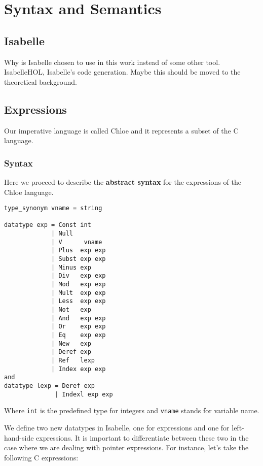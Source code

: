 \chapter{Syntax and Semantics}\label{chapter:semantics}

\section{Isabelle}

Why is Isabelle chosen to use in this work instead of some other tool.
IsabelleHOL, Isabelle's code generation.
Maybe this should be moved to the theoretical background.

\section{Expressions}

Our imperative language is called Chloe and it represents a subset of the C language.

\subsection{Syntax}

Here we proceed to describe the \textbf{abstract syntax} for the expressions of the Chloe language.

\begin{lstlisting}[caption=Chloe expressions, frame=single]
type_synonym vname = string

datatype exp = Const int
             | Null
             | V      vname
             | Plus  exp exp
             | Subst exp exp
             | Minus exp
             | Div   exp exp
             | Mod   exp exp
             | Mult  exp exp
             | Less  exp exp
             | Not   exp
             | And   exp exp
             | Or    exp exp
             | Eq    exp exp
             | New   exp
             | Deref exp
             | Ref   lexp
             | Index exp exp
and
datatype lexp = Deref exp
              | Indexl exp exp
\end{lstlisting}

Where \verb|int| is the predefined type for integers and \verb|vname| stands for variable name.

We define two new datatypes in Isabelle, one for expressions and one for left-hand-side expressions.
It is important to differentiate between these two in the case where we are dealing with pointer expressions.
For instance, let's take the following C expressions:

